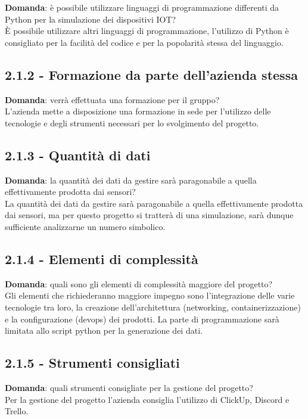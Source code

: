 \documentclass[italian,12pt]{article} %
\begin{document}
\begin{flushleft}
	\textbf{Domanda}: è possibile utilizzare linguaggi di programmazione differenti da Python per la simulazione dei dispositivi IOT?\\
	È possibile utilizzare altri linguaggi di programmazione, l'utilizzo di Python è consigliato per la facilità del codice e per la popolarità stessa del linguaggio.


\subsection*{2.1.2 - Formazione da parte dell'azienda stessa}

	\textbf{Domanda}: verrà effettuata una formazione per il gruppo?\\
	L'azienda mette a disposizione una formazione in sede per l'utilizzo delle tecnologie e degli strumenti necessari per lo svolgimento del progetto.

\subsection*{2.1.3 - Quantità di dati}
	\textbf{Domanda}: la quantità dei dati da gestire sarà paragonabile a quella effettivamente prodotta dai sensori?\\
	La quantità dei dati da gestire sarà paragonabile a quella effettivamente prodotta dai sensori, ma per questo progetto si tratterà di una simulazione, sarà dunque sufficiente analizzarne un numero simbolico.

\subsection*{2.1.4 - Elementi di complessità}
	\textbf{Domanda}: quali sono gli elementi di complessità maggiore del progetto?\\
	Gli elementi che richiederanno maggiore impegno sono l'integrazione delle varie tecnologie tra loro, la creazione dell'architettura (networking, containerizzazione) e la configurazione (devops) dei prodotti. La parte di programmazione sarà limitata allo script python per la generazione dei dati.

\subsection*{2.1.5 - Strumenti consigliati}
	\textbf{Domanda}: quali strumenti consigliate per la gestione del progetto?\\
	Per la gestione del progetto l'azienda consiglia l'utilizzo di ClickUp, Discord e Trello.


\end{flushleft}
\end{document}

